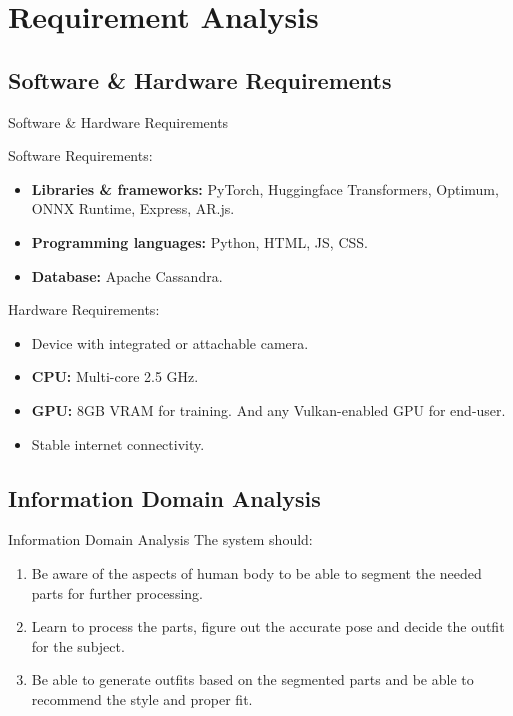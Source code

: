 \section{Requirement Analysis}

\subsection{Software \& Hardware Requirements}
\begin{frame}{Software \& Hardware Requirements}
	\begin{multicols}{2}
		Software Requirements:
		\begin{itemize}
			\item \textbf{Libraries \& frameworks:} PyTorch, Huggingface Transformers, Optimum, ONNX Runtime, Express, AR.js.
			\item \textbf{Programming languages:} Python, HTML, JS, CSS.
			\item \textbf{Database:} Apache Cassandra.
		\end{itemize}

		\break

		Hardware Requirements:
		\begin{itemize}
			\item Device with integrated or attachable camera.
			\item \textbf{CPU:} Multi-core 2.5 GHz.
			\item \textbf{GPU:} 8GB VRAM for training. And any Vulkan-enabled GPU for end-user.
			\item Stable internet connectivity.
		\end{itemize}
	\end{multicols}
\end{frame}

\subsection{Information Domain Analysis}
\begin{frame}{Information Domain Analysis}
	The system should:
	\begin{enumerate}
		\item Be aware of the aspects of human body to be able to segment the needed parts for further processing.
		\item Learn to process the parts, figure out the accurate pose and decide the outfit for the subject.
		\item Be able to generate outfits based on the segmented parts and be able to recommend the style and proper fit.
	\end{enumerate}
\end{frame}

